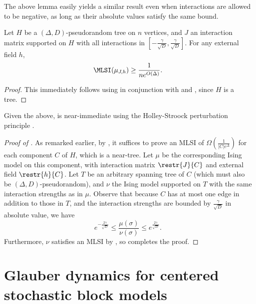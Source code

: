 \documentclass[11pt,letterpaper]{article}
\begin{document}
    The above lemma easily yields a similar result even when interactions are allowed to be negative, as long as their absolute values satisfy the same bound.

    \begin{corollary}
        \label{lem:pseudorandom-nonferro-mixing}
         Let $H$ be a $(\Delta,D)$-pseudorandom tree on $n$ vertices, and $J$ an interaction matrix supported on $H$ with all interactions in $\left[- \frac{\gamma}{\sqrt{D}}, \frac{\gamma}{\sqrt{D}}\right]$.
        For any external field $h$, 
        \[ \MLSI(\mu_{J,h}) \ge \frac{1}{ne^{O(\Delta)}}. \]
    \end{corollary}
    \begin{proof}
        This immediately follows using  in conjunction with  and , since $H$ is a tree.
    \end{proof}

    Given the above,  is near-immediate using the Holley-Stroock perturbation principle .

    \begin{proof}[Proof of ]
        As remarked earlier, by , it suffices to prove an MLSI of $\Omega\left(\frac{1}{|C|e^{\Delta}}\right)$ for each component $C$ of $H$, which is a near-tree. Let $\mu$ be the corresponding Ising model on this component, with interaction matrix $\restr{J}{C}$ and external field $\restr{h}{C}$. Let $T$ be an arbitrary spanning tree of $C$ (which must also be $(\Delta,D)$-pseudorandom), and $\nu$ the Ising model supported on $T$ with the same interaction strengths as in $\mu$. Observe that because $C$ has at most one edge in addition to those in $T$, and the interaction strengths are bounded by $\frac{\gamma}{\sqrt{D}}$ in absolute value, we have
        \[ e^{-\frac{2\gamma}{\sqrt{D}}} \le \frac{\mu(\sigma)}{\nu(\sigma)} \le e^{\frac{2\gamma}{\sqrt{D}}}. \]
        Furthermore, $\nu$ satisfies an MLSI by , so  completes the proof.
    \end{proof}%

% 


\section{Glauber dynamics for centered stochastic block models}\label{sec:sbm-results}
\end{document}
